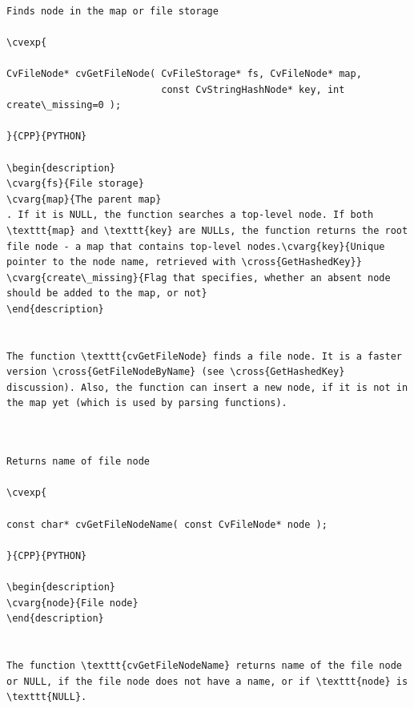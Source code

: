 \label{GetFileNode}
\begin{verbatim}

Finds node in the map or file storage

\cvexp{

CvFileNode* cvGetFileNode( CvFileStorage* fs, CvFileNode* map,
                           const CvStringHashNode* key, int create\_missing=0 );

}{CPP}{PYTHON}

\begin{description}
\cvarg{fs}{File storage}
\cvarg{map}{The parent map}
. If it is NULL, the function searches a top-level node. If both \texttt{map} and \texttt{key} are NULLs, the function returns the root file node - a map that contains top-level nodes.\cvarg{key}{Unique pointer to the node name, retrieved with \cross{GetHashedKey}}
\cvarg{create\_missing}{Flag that specifies, whether an absent node should be added to the map, or not}
\end{description}


The function \texttt{cvGetFileNode} finds a file node. It is a faster version \cross{GetFileNodeByName} (see \cross{GetHashedKey} discussion). Also, the function can insert a new node, if it is not in the map yet (which is used by parsing functions).


\end{verbatim}
\label{GetFileNodeName}
\begin{verbatim}

Returns name of file node

\cvexp{

const char* cvGetFileNodeName( const CvFileNode* node );

}{CPP}{PYTHON}

\begin{description}
\cvarg{node}{File node}
\end{description}


The function \texttt{cvGetFileNodeName} returns name of the file node or NULL, if the file node does not have a name, or if \texttt{node} is \texttt{NULL}.


\end{verbatim}
\label{ReadInt}
